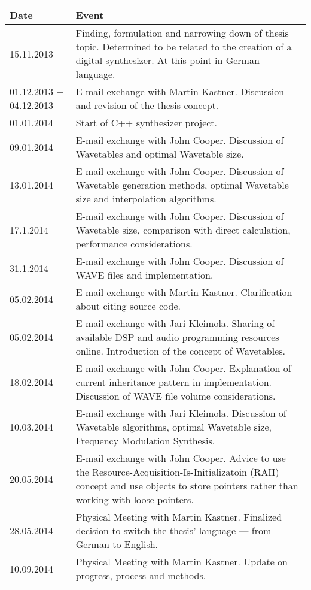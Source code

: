 { \small

\begin{tabular}{| p{2cm} | p{13cm} |}
  \hline
  \rowcolor[gray]{0.8}
  Date & Event \\
  \hline
  15.11.2013 &  Finding, formulation and narrowing down of thesis topic. Determined to be related to the creation of a digital synthesizer. At this point in German language.\\
  \hline
  01.12.2013 + 04.12.2013 & E-mail exchange with Martin Kastner. Discussion and revision of the thesis concept. \\
  \hline
  01.01.2014 & Start of C++ synthesizer project. \\
  \hline
  09.01.2014 & E-mail exchange with John Cooper. Discussion of Wavetables and optimal Wavetable size. \\
  \hline
  13.01.2014 & E-mail exchange with John Cooper. Discussion of Wavetable generation methods, optimal Wavetable size and interpolation algorithms. \\
  \hline
  17.1.2014 & E-mail exchange with John Cooper. Discussion of Wavetable size, comparison with direct calculation, performance considerations. \\
  \hline
  31.1.2014 & E-mail exchange with John Cooper. Discussion of WAVE files and implementation. \\
  \hline
  05.02.2014 & E-mail exchange with Martin Kastner. Clarification about citing source code. \\
  \hline
  05.02.2014 & E-mail exchange with Jari Kleimola. Sharing of available DSP and audio programming resources online. Introduction of the concept of Wavetables. \\
  \hline
  18.02.2014 & E-mail exchange with John Cooper. Explanation of current inheritance pattern in implementation. Discussion of WAVE file volume considerations. \\
  \hline
  10.03.2014 & E-mail exchange with Jari Kleimola. Discussion of Wavetable algorithms, optimal Wavetable size, Frequency Modulation Synthesis. \\
  \hline
  20.05.2014 & E-mail exchange with John Cooper. Advice to use the Resource-Acquisition-Is-Initializatoin (RAII) concept and use objects to store pointers rather than working with loose pointers. \\
  \hline
  28.05.2014 & Physical Meeting with Martin Kastner. Finalized decision to switch the thesis' language --- from German to English. \\
  \hline
  10.09.2014 & Physical Meeting with Martin Kastner. Update on progress, process and methods. \\

\end{tabular}}
